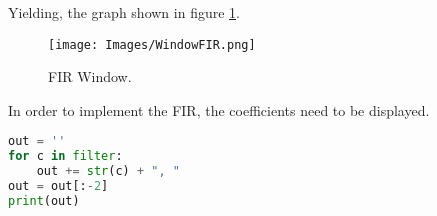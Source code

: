 Yielding, the graph shown in figure \ref{fig:FIRWindow}.

\begin{figure}[H]
    \centering
    \texttt{[image: Images/WindowFIR.png]}
    \caption{FIR Window.}
    \label{fig:FIRWindow}
\end{figure}

In order to implement the FIR, the coefficients need to be displayed.

\begin{lstlisting}[language=python, caption = Specification Definition]
out = ''
for c in filter:
    out += str(c) + ", "
out = out[:-2]
print(out)
\end{lstlisting}

